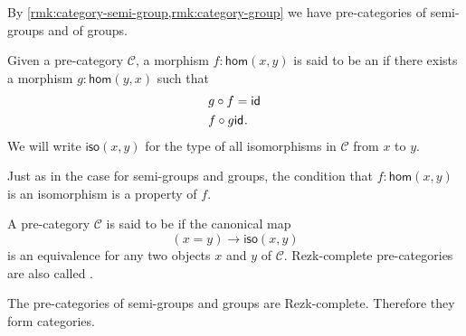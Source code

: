 \begin{eg}
  By \cref{rmk:category-semi-group,rmk:category-group} we have pre-categories of semi-groups and of groups.
\end{eg}

\begin{defn}
  Given a pre-category $\mathcal{C}$, a morphism $f:\mathsf{hom}(x,y)$ is said to be an  if there exists a morphism $g:\mathsf{hom}(y,x)$ such that
  \begin{align*}
    g\circ f & = \mathsf{id}_{} \\
    f \circ g & \mathsf{id}_{}.
  \end{align*}
  We will write $\mathsf{iso}(x,y)$ for the type of all isomorphisms in $\mathcal{C}$ from $x$ to $y$.
\end{defn}

\begin{rmk}
  Just as in the case for semi-groups and groups, the condition that $f:\mathsf{hom}(x,y)$ is an isomorphism is a property of $f$.
\end{rmk}

\begin{defn}
  A pre-category $\mathcal{C}$ is said to be  if the canonical map
  \begin{equation*}
    (x=y)\to \mathsf{iso}(x,y)
  \end{equation*}
  is an equivalence for any two objects $x$ and $y$ of $\mathcal{C}$. Rezk-complete pre-categories are also called .
\end{defn}

\begin{eg}
  The pre-categories of semi-groups and groups are Rezk-complete. Therefore they form categories.
\end{eg}

